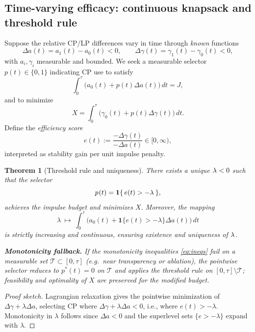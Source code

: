 \documentclass[aps,pre,twocolumn,showpacs,superscriptaddress]{revtex4-2}
\newtheorem{theorem}{Theorem}
\theoremstyle{definition}
\begin{document}
\subsection{Time-varying efficacy: continuous knapsack and threshold rule}\label{subsec:ck5}

Suppose the relative CP/LP differences vary in time through \emph{known} functions
\begin{equation}\label{eq:Deltas5}
\Delta a(t)=a_1(t)-a_0(t)<0,\qquad \Delta\gamma(t)=\gamma_1(t)-\gamma_0(t)<0,
\end{equation}
with $a_i,\gamma_i$ measurable and bounded. We seek a measurable selector $p(t)\in\{0,1\}$ indicating CP use to satisfy
\[
\int_0^\tau \big(a_0(t)+p(t)\Delta a(t)\big)\,dt = J,
\]
and to minimize
\[
X=\int_0^\tau \big(\gamma_0(t)+p(t)\Delta\gamma(t)\big)\,dt.
\]
Define the \emph{efficiency score}
\begin{equation}\label{eq:score5}
e(t):=\frac{-\Delta\gamma(t)}{-\Delta a(t)}\in[0,\infty),
\end{equation}
interpreted as stability gain per unit impulse penalty.

\begin{theorem}[Threshold rule and uniqueness]\label{thm:threshold5}
There exists a unique $\lambda^{\*}<0$ such that the selector
\begin{equation}\label{eq:selector5}
p^{\*}(t)=\mathbf{1}\{\,e(t)>-\lambda^{\*}\,\},
\end{equation}
achieves the impulse budget and minimizes $X$. Moreover, the mapping
\[
\lambda\ \mapsto\ \int_0^\tau \big(a_0(t)+\mathbf{1}\{e(t)>-\lambda\}\Delta a(t)\big)\,dt
\]
is strictly increasing and continuous, ensuring existence and uniqueness of $\lambda^{\*}$.

\noindent\textbf{Monotonicity fallback.}
If the monotonicity inequalities \eqref{eq:ineqs} fail on a measurable set $\mathcal{T}\subset[0,\tau]$ (e.g.\ near transparency or ablation), the pointwise selector reduces to $p^{\ast}(t)=0$ on $\mathcal{T}$ and applies the threshold rule on $[0,\tau]\setminus \mathcal{T}$; feasibility and optimality of $X$ are preserved for the modified budget.
\end{theorem}

\begin{proof}[Proof sketch]
Lagrangian relaxation gives the pointwise minimization of $\Delta\gamma+\lambda\Delta a$, selecting CP where $\Delta\gamma+\lambda\Delta a<0$, i.e., where $e(t)>-\lambda$. Monotonicity in $\lambda$ follows since $\Delta a<0$ and the superlevel sets $\{e>-\lambda\}$ expand with $\lambda$.
\end{proof}
\end{document}
